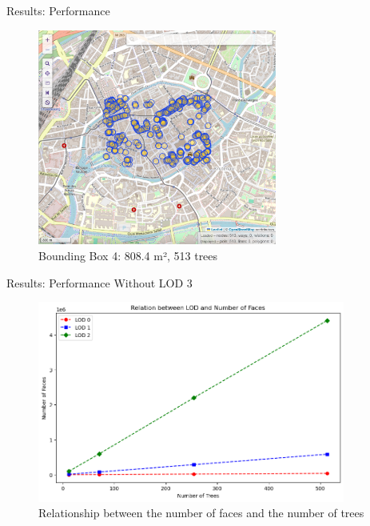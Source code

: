 \documentclass[10pt]{beamer}
\begin{document}
\begin{frame}{Results: Performance}
\Large
\begin{figure}[H]
	\centering
	\includegraphics[width=0.7\textwidth]{images/ovt-bbox4.png}
	\caption{Bounding Box 4: 808.4 m², 513 trees}
\end{figure}
\end{frame}

\begin{frame}{Results: Performance}
\Large
Without LOD 3
\begin{figure}[H]
	\centering
	\includegraphics[width=0.9\textwidth]{images/perf_lod_faces.png}
	\caption{Relationship between the number of faces and the number of trees}
\end{figure}
\end{frame}
\end{document}
